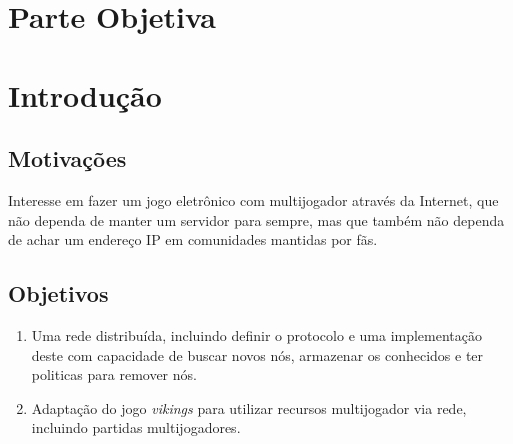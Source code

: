 \chapter*{Parte Objetiva}
\label{sec:parte_objetiva}
\chapter{Introdução}
\label{sec:intr}

\section{Motivações}
\label{sec:intr:motivacoes}

Interesse em fazer um jogo eletrônico com multijogador através da Internet, que não dependa de manter um servidor para sempre, mas que também não dependa de achar um endereço IP em comunidades mantidas por fãs.

\section{Objetivos}
\label{sec:intr:objetivos}

\begin{enumerate}
  \item Uma rede distribuída, incluindo definir o protocolo e uma implementação deste com capacidade de 
    buscar novos nós, armazenar os conhecidos e ter politicas para remover nós.
    
  \item Adaptação do jogo \textit{vikings} para utilizar recursos multijogador via rede, incluindo partidas
    multijogadores.
\end{enumerate}





